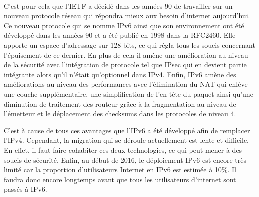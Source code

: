 \\
C'est pour cela que l'IETF a décidé dans les années 90 de travailler sur un nouveau protocole 
réseau qui répondra mieux aux besoin d'internet aujourd'hui. Ce nouveau protocole qui se nomme
IPv6 ainsi que son environnement ont été développé dans les années 90 et a été publié en 1998
 dans la RFC2460. Elle apporte un espace d'adressage sur 128 bits, ce qui régla tous les soucis
 concernant l'épuisement de ce dernier. 
En plus de cela il amène une amélioration au niveau de la sécurité avec l'intégration de protocole
 tel que IPsec qui en devient partie intégrante alors qu'il n'était qu'optionnel dans IPv4. Enfin,
 IPv6 amène des améliorations au niveau des performances avec l'élimination du NAT qui enlève une
 couche supplémentaire, une simplification de l'en-tête du paquet ainsi qu'une diminution de
 traitement des routeur grâce à la fragmentation au niveau de l'émetteur et le déplacement des
 checksums dans les protocoles de niveau 4.

C'est à cause de tous ces avantages que l'IPv6 a été développé afin de remplacer l'IPv4. 
Cependant, la migration qui se déroule actuellement est lente et difficile. En effet, il 
faut faire cohabiter ces deux technologies, ce qui peut mener à des soucis de sécurité. Enfin, au 
début de 2016, le déploiement IPv6 est encore très limité car la proportion d'utilisateurs Internet en
 IPv6 est estimée à 10\%. Il faudra donc encore longtemps avant que tous les utilisateurs d'internet 
sont passés à IPv6.



